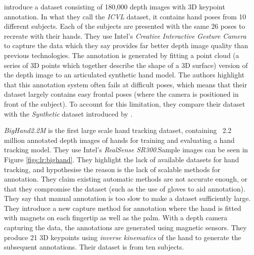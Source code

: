 \cite{tang2016latent} introduce a dataset consisting of 180,000 depth images with 3D keypoint annotation. In what they call the {\slshape ICVL} dataset, it contains hand poses from 10 different subjects. Each of the subjects are presented with the same 26 poses to recreate with their hands. They use Intel’s {\slshape Creative Interactive Gesture Camera} to capture the data which they say provides far better depth image quality than previous technologies. The annotation is generated by fitting a point cloud (a series of 3D points which together describe the shape of a 3D surface) version of the depth image to an articulated synthetic hand model. The authors highlight that this annotation system often fails at difficult poses, which means that their dataset largely contains easy frontal poses (where the camera is positioned in front of the subject). To account for this limitation, they compare their dataset with the {\slshape Synthetic} dataset introduced by \cite{sharp2015accurate}.

{\slshape BigHand2.2M} \cite{yuan2017bighand2} is the first large scale hand tracking dataset, containing ~2.2 million annotated depth images of hands for training and evaluating a hand tracking model. They use Intel's {\slshape RealSense SR300}.Sample images can be seen in Figure \ref{figs:lr:bighand}. They highlight the lack of available datasets for hand tracking, and hypothesise the reason is the lack of scalable methods for annotation. They claim existing automatic methods are not accurate enough, or that they compromise the dataset (such as the use of gloves to aid annotation). They say that manual annotation is too slow to make a dataset sufficiently large. They introduce a new capture method for annotation where the hand is fitted with magnets on each fingertip as well as the palm. With a depth camera capturing the data, the annotations are generated using magnetic sensors. They produce 21 3D keypoints using {\slshape inverse kinematics} of the hand to generate the subsequent annotations. Their dataset is from ten subjects.

